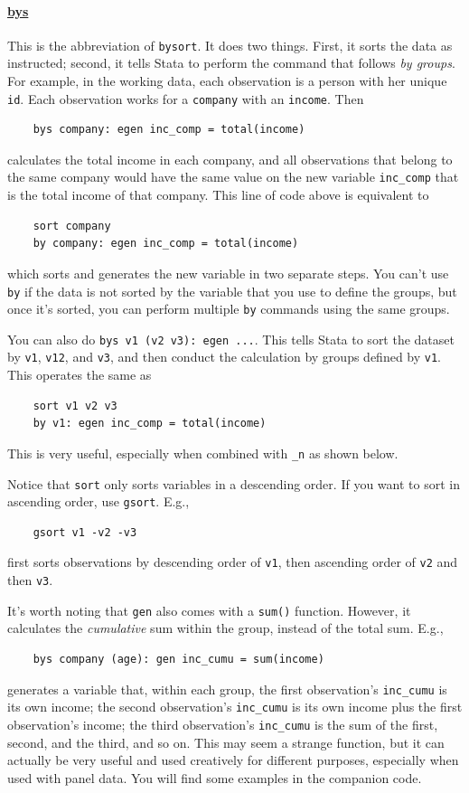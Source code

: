\paragraph{\underline{bys}} This is the abbreviation of \verb|bysort|. It does two things. First, it sorts the data as instructed; second, it tells Stata to perform the command that follows \textit{by groups}. For example, in the working data, each observation is a person with her unique \verb|id|. Each observation works for a \verb|company| with an \verb|income|. Then 
\begin{verbatim}
    bys company: egen inc_comp = total(income)
\end{verbatim}
calculates the total income in each company, and all observations that belong to the same company would have the same value on the new variable \verb|inc_comp| that is the total income of that company. This line of code above is equivalent to 
\begin{verbatim}
    sort company
    by company: egen inc_comp = total(income)
\end{verbatim}
which sorts and generates the new variable in two separate steps. You can't use \verb|by| if the data is not sorted by the variable that you use to define the groups, but once it's sorted, you can perform multiple \verb|by| commands using the same groups. 

You can also do \verb|bys v1 (v2 v3): egen ...|. This tells Stata to sort the dataset by \verb|v1|, \verb|v12|, and \verb|v3|, and then conduct the calculation by groups defined by \verb|v1|. This operates the same as 
\begin{verbatim}
    sort v1 v2 v3
    by v1: egen inc_comp = total(income)
\end{verbatim}
This is very useful, especially when combined with \verb|_n| as shown below. 

Notice that \verb|sort| only sorts variables in a descending order. If you want to sort in ascending order, use \verb|gsort|. E.g., 
\begin{verbatim}
    gsort v1 -v2 -v3
\end{verbatim}
first sorts observations by descending order of \verb|v1|, then ascending order of \verb|v2| and then \verb|v3|.

It's worth noting that \verb|gen| also comes with a \verb|sum()| function. However, it calculates the \textit{cumulative} sum within the group, instead of the total sum. E.g., 
\begin{verbatim}
    bys company (age): gen inc_cumu = sum(income)
\end{verbatim}
generates a variable that, within each group, the first observation's \verb|inc_cumu| is its own income; the second observation's \verb|inc_cumu| is its own income plus the first observation's income; the third observation's \verb|inc_cumu| is the sum of the first, second, and the third, and so on. This may seem a strange function, but it can actually be very useful and used creatively for different purposes, especially when used with panel data. You will find some examples in the companion code. 

